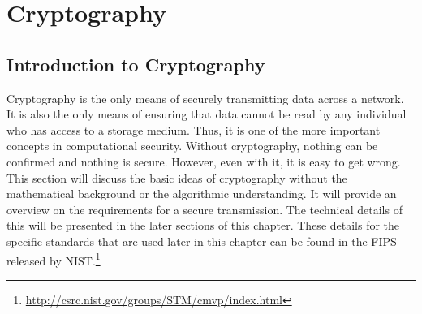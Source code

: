 \documentclass[a4paper,11pt]{report}
\begin{document}
			
\chapter{Cryptography}
	\label{ch:Cryptography}
	\section{Introduction to Cryptography}
		Cryptography is the only means of securely transmitting data across a network. 
		It is also the only means of ensuring that data cannot be read by any individual who has access to a storage medium. 
		Thus, it is one of the more important concepts in computational security. 
		Without cryptography, nothing can be confirmed and nothing is secure. 
		However, even with it, it is easy to get wrong. 
		This section will discuss the basic ideas of cryptography without the mathematical background or the algorithmic understanding. 
		It will provide an overview on the requirements for a secure transmission. 
		The technical details of this will be presented in the later sections of this chapter. 
		These details for the specific standards that are used later in this chapter can be found in the FIPS released by NIST.\footnote{\url{http://csrc.nist.gov/groups/STM/cmvp/index.html}}
\end{document}

